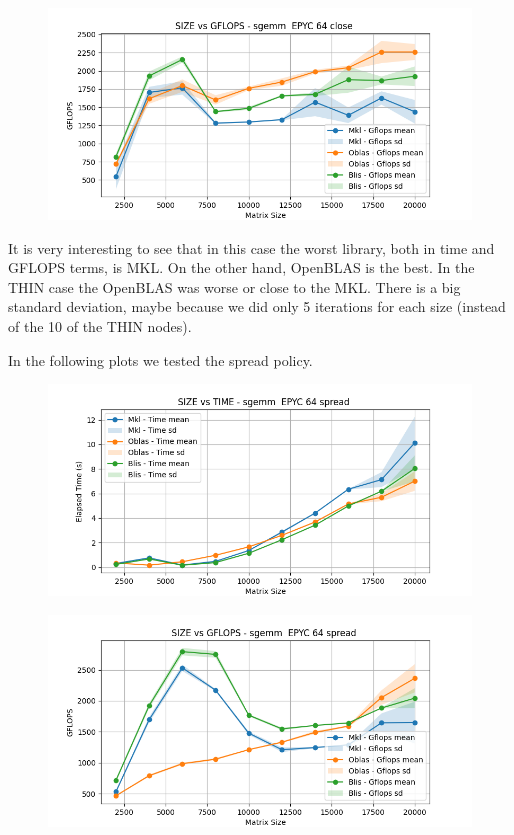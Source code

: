 \documentclass[12pt, titlepage]{report}
\begin{document}
\begin{figure}[H]
    \centering
    \includegraphics[width=\textwidth]{EPYC 64/sgemm__EPYC_64_close_gflops.png}
\end{figure}

It is very interesting to see that in this case the worst library, both in time and GFLOPS terms, is MKL. On the other hand, OpenBLAS is the best. In the THIN case the OpenBLAS was worse or close to the MKL. There is a big standard deviation, maybe because we did only 5 iterations for each size (instead of the 10 of the THIN nodes). 

In the following plots we tested the spread policy. 
\begin{figure}[H]
    \centering
    \includegraphics[width=\textwidth]{EPYC 64/sgemm__EPYC_64_spread_time.png}
\end{figure}

\begin{figure}[H]
    \centering
    \includegraphics[width=\textwidth]{EPYC 64/sgemm__EPYC_64_spread_gflops.png}
\end{figure}
\end{document}
